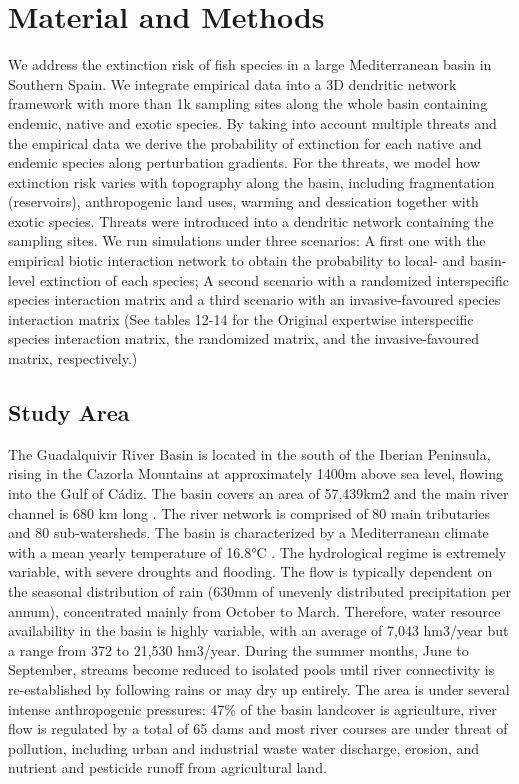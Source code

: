 \documentclass[11pt,a4paper]{article}
\begin{document}
\section{Material and Methods}
We address the extinction risk of fish species in a large Mediterranean basin in Southern Spain. We integrate empirical data into a 3D dendritic network framework with more than 1k sampling sites along the whole basin containing endemic, native and exotic species. By taking into account multiple threats and the empirical data we derive the probability of extinction for each native and endemic species along perturbation gradients. For the threats, we model how extinction risk varies with topography along the basin, including fragmentation (reservoirs), anthropogenic land uses, warming and dessication together with exotic species. Threats were introduced into a dendritic network containing the sampling sites. We run simulations under three scenarios: A first one with the empirical biotic interaction network to obtain the probability to local- and basin-level extinction of each species; A second scenario with a randomized interspecific species interaction matrix and a third scenario with an invasive-favoured species interaction matrix (See tables 12-14 for the Original expertwise interspecific species interaction matrix, the randomized matrix, and the invasive-favoured matrix, respectively.)

\subsection{Study Area}
The Guadalquivir River Basin is located in the south of the Iberian Peninsula, rising in the Cazorla Mountains at approximately 1400m above sea level, flowing into the Gulf of Cádiz. The basin covers an area of 57,439km2 and the main river channel is 680 km long \cite{GRANADOLORENCIO199191}. The river network is comprised of 80 main tributaries and 80 sub-watersheds. The basin is characterized by a Mediterranean climate with a mean yearly temperature of 16.8°C \cite{doi:10.1080/07900627.2012.640875}. The hydrological regime is extremely variable, with severe droughts and flooding. The flow is typically dependent on the seasonal distribution of rain (630mm of unevenly distributed precipitation per annum), concentrated mainly from October to March. Therefore, water resource availability in the basin is highly variable, with an average of 7,043 hm3/year but a range from 372 to 21,530 hm3/year. During the summer months, June to September, streams become reduced to isolated pools until river connectivity is re-established by following rains or may dry up entirely. The area is under several intense anthropogenic pressures: 47\% of the basin landcover is agriculture, river flow is regulated by a total of 65 dams and most river courses are under threat of pollution, including urban and industrial waste water discharge, erosion, and nutrient and pesticide runoff from agricultural land.
\end{document}
